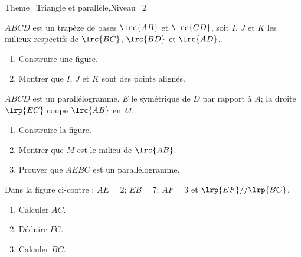 \documentclass[a4paper,12pt]{article}
\begin{document}
\begin{Maquette}[Fiche]{Theme=Triangle et parallèle,Niveau=2}

\begin{exercice}
$ABCD$ est un trapèze de bases $\lrc{AB}$ et $\lrc{CD}$, soit $I$, $J$ et $K$ les milieux respectifs de $\lrc{BC}$, $\lrc{BD}$ et  $\lrc{AD}$.
\begin{enumerate}
\item Construire une figure.
\item Montrer que $I$, $J$ et $K$ sont des points alignés.
\end{enumerate}
\end{exercice}

\begin{exercice}
$ABCD$ est un parallélogramme, $E$ le symétrique de $D$ par rapport à $A$; la droite $\lrp{EC}$ coupe $\lrc{AB}$ en $M$.
\begin{enumerate}
\item Construire la figure.
\item Montrer que $M$ est le milieu de $\lrc{AB}$.
\item Prouver que $AEBC$ est un parallélogramme.
\end{enumerate}
\end{exercice}

\begin{exercice}
\begin{minipage}{0.5\linewidth}
Dans la figure ci-contre : $AE=2$; $EB=7$; $AF=3$ et $\lrp{EF}//\lrp{BC}$.
\begin{enumerate}
\item Calculer $AC$.
\item Déduire $FC$.
\item Calculer $BC$.
\end{enumerate}
\end{minipage}
\begin{minipage}{0.5\linewidth}
\end{minipage}
\end{exercice}


\end{Maquette}
\end{document}
